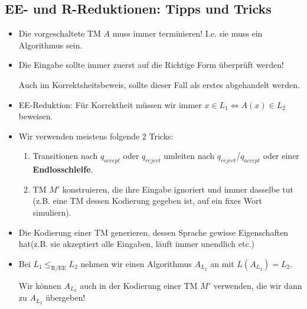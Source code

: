 \documentclass[a4paper, 11pt]{article}
\begin{document}
                
                
                
                    \subsection{EE- und R-Reduktionen: Tipps und Tricks}
                        \begin{itemize}[label=-]
                            \item Die vorgeschaltete TM $A$ muss immer terminieren! I.e. sie muss ein Algorithmus sein.
                            
                            \item Die Eingabe sollte immer zuerst auf die Richtige Form überprüft werden!
                            
                            Auch im Korrektsheitsbeweis, sollte dieser Fall als erstes abgehandelt werden.
                            \item EE-Reduktion: Für Korrektheit müssen wir immer $x \in L_1 \iff A(x) \in L_2$ beweisen.
                            
                            \item Wir verwenden meistens folgende 2 Tricks:
                            \begin{enumerate}[label=\roman*.]
                                \item Transitionen nach $q_{accept}$ oder $ q_{reject}$ umleiten nach $q_{reject}$/$q_{accept}$ oder einer \textbf{Endlosschleife}. 
                                \item TM $M'$ konstruieren, die ihre Eingabe ignoriert und immer dasselbe tut (z.B. eine TM dessen Kodierung gegeben ist, auf ein fixes Wort simuliern).
                            \end{enumerate}
                            
                            \item Die Kodierung einer TM generieren, dessen Sprache gewisse Eigenschaften hat(z.B. sie akzeptiert alle Eingaben, läuft immer unendlich etc.)
                            
                            \item Bei $L_1 \leq_{\text{R/EE}} L_2$ nehmen wir einen Algorithmus $A_{L_2}$ an mit $L(A_{L_2}) = L_2$. 
                            
                            Wir können $A_{L_2}$ auch in der Kodierung einer TM $M'$ verwenden, die wir dann zu $A_{L_2}$ übergeben! 
                        \end{itemize}
\end{document}
